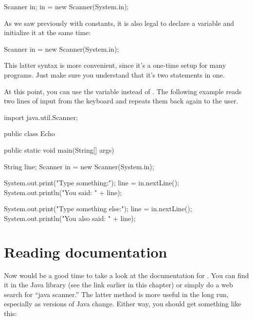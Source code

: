 \begin{code}
    Scanner in;
    in = new Scanner(System.in);
\end{code}


As we saw previously with constants, it is also legal to declare a variable and initialize it at the same time:

\begin{code}
    Scanner in = new Scanner(System.in);
\end{code}

This latter syntax is more convenient, since it's a one-time setup for many programs.
Just make sure you understand that it's two statements in one.

At this point, you can use the variable  instead of .
The following example reads two lines of input from the keyboard and repeats them back again to the user.

\begin{code}
import java.util.Scanner;

public class Echo {

    public static void main(String[] args) {
        String line;
        Scanner in = new Scanner(System.in);

        System.out.print("Type something:");
        line = in.nextLine();
        System.out.println("You said: " + line);

        System.out.print("Type something else:");
        line = in.nextLine();
        System.out.println("You also said: " + line);
    }

}
\end{code}


\section{Reading documentation}
\label{documentation}


Now would be a good time to take a look at the documentation for .
You can find it in the Java library (see the link earlier in this chapter) or simply do a web search for ``java scanner.''
The latter method is more useful in the long run, especially as versions of Java change.
Either way, you should get something like this:

